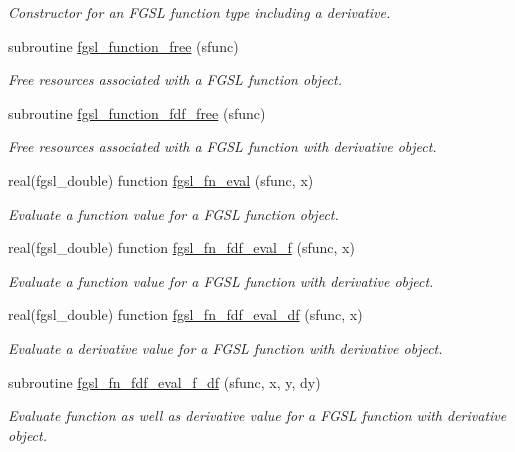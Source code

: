 \begin{DoxyCompactItemize}
\begin{DoxyCompactList}\small\item\em Constructor for an F\+G\+S\+L function type including a derivative. \end{DoxyCompactList}\item 
subroutine \hyperlink{math_8finc_a2119e5b0091febc676ee418b8b211bf5}{fgsl\+\_\+function\+\_\+free} (sfunc)
\begin{DoxyCompactList}\small\item\em Free resources associated with a F\+G\+S\+L function object. \end{DoxyCompactList}\item 
subroutine \hyperlink{math_8finc_a03e913de6c833197efae52ed50290cfb}{fgsl\+\_\+function\+\_\+fdf\+\_\+free} (sfunc)
\begin{DoxyCompactList}\small\item\em Free resources associated with a F\+G\+S\+L function with derivative object. \end{DoxyCompactList}\item 
real(fgsl\+\_\+double) function \hyperlink{math_8finc_a6c38a834ecc0149664dbb667f104fcce}{fgsl\+\_\+fn\+\_\+eval} (sfunc, x)
\begin{DoxyCompactList}\small\item\em Evaluate a function value for a F\+G\+S\+L function object. \end{DoxyCompactList}\item 
real(fgsl\+\_\+double) function \hyperlink{math_8finc_a76c063c0086a88bd27f75c808041b9dd}{fgsl\+\_\+fn\+\_\+fdf\+\_\+eval\+\_\+f} (sfunc, x)
\begin{DoxyCompactList}\small\item\em Evaluate a function value for a F\+G\+S\+L function with derivative object. \end{DoxyCompactList}\item 
real(fgsl\+\_\+double) function \hyperlink{math_8finc_a67a49e7d1dec1c5c407e1ccd62db581a}{fgsl\+\_\+fn\+\_\+fdf\+\_\+eval\+\_\+df} (sfunc, x)
\begin{DoxyCompactList}\small\item\em Evaluate a derivative value for a F\+G\+S\+L function with derivative object. \end{DoxyCompactList}\item 
subroutine \hyperlink{math_8finc_a950ecd7cffcfa33d10a2b8db5c6befcd}{fgsl\+\_\+fn\+\_\+fdf\+\_\+eval\+\_\+f\+\_\+df} (sfunc, x, y, dy)
\begin{DoxyCompactList}\small\item\em Evaluate function as well as derivative value for a F\+G\+S\+L function with derivative object. \end{DoxyCompactList}\end{DoxyCompactItemize}


